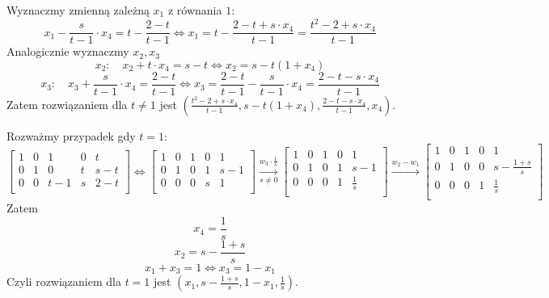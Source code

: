 \documentclass[]{sinol}
\begin{document}
\begin{zadanie}
        Wyznaczmy zmienną zależną $x_1$ z równania $1$:
        $$ x_1 - \frac{s}{t-1} \cdot x_4 = t - \frac{2-t}{t-1} \iff x_1 = t - \frac{2-t+s\cdot x_4}{t-1} = \frac{t^2 - 2 + s\cdot x_4}{t-1} $$
        Analogicznie wyznaczmy $x_2, x_3$
        $$ x_2: \quad x_2 + t \cdot x_4 = s-t \iff x_2 = s - t\left( 1 + x_4\right)
        $$
        $$ x_3: \quad  x_3 + \frac{s}{t-1}\cdot x_4 = \frac{2-t}{t-1} \iff x_3 =  \frac{2-t}{t-1} - \frac{s}{t-1}\cdot x_4 = \frac{2-t-s\cdot x_4}{t-1}$$
        Zatem rozwiązaniem dla $t \neq 1$ jest $( \frac{t^2 - 2 + s\cdot x_4}{t-1}, s - t\left( 1 + x_4\right), \frac{2-t-s\cdot x_4}{t-1}, x_4)$.

        Rozważmy przypadek gdy $t=1$:
        \[
         \begin{bmatrix}
            1 & 0 & 1 & 0 & t \\
            0 & 1 & 0 & t & s-t \\
            0 & 0 & t-1 & s & 2-t \\
        \end{bmatrix}        
        \Leftrightarrow
         \begin{bmatrix}
            1 & 0 & 1 & 0 & 1 \\
            0 & 1 & 0 & 1 & s-1 \\
            0 & 0 & 0 & s & 1 \\
        \end{bmatrix}  
        \xrightarrow[s \neq 0]{w_3 \cdot \frac{1}{s}}
        \begin{bmatrix}
            1 & 0 & 1 & 0 & 1 \\
            0 & 1 & 0 & 1 & s-1 \\
            0 & 0 & 0 & 1 & \frac{1}{s} \\
        \end{bmatrix}  
        \xrightarrow[]{w_2-w_1}
        \begin{bmatrix}
            1 & 0 & 1 & 0 & 1 \\
            0 & 1 & 0 & 0 & s -\frac{1+s}{s} \\
            0 & 0 & 0 & 1 & \frac{1}{s} \\
        \end{bmatrix}  
        \]
        Zatem 
        $$x_4 = \frac{1}{s}$$
        $$x_2 = s -\frac{1+s}{s}$$
        $$x_1 + x_3 = 1 \iff x_3 = 1-x_1$$
        Czyli rozwiązaniem dla $t=1$ jest $(x_1, s -\frac{1+s}{s}, 1-x_1, \frac{1}{s})$.


\end{zadanie}
\end{document}
